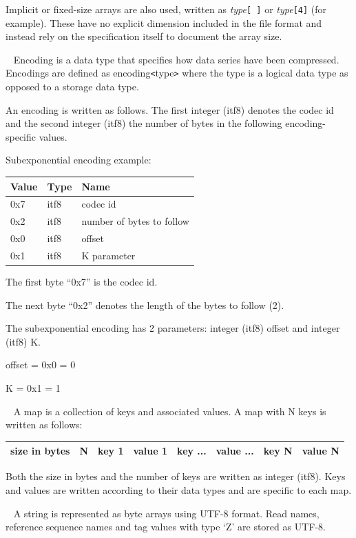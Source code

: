 \documentclass[a4paper]{article}
\begin{document}
\begin{description}
Implicit or fixed-size arrays are also used, written as \textit{type}\texttt{[ ]} or \textit{type}\texttt{[4]} (for example).
These have no explicit dimension included in the file format and instead rely on the specification itself to document the array size.


\item[{Encoding}]\ \newline
Encoding is a data type that specifies how data series have been compressed. Encodings 
are defined as encoding\texttt{<}type\texttt{>} where the type is a logical data 
type as opposed to a storage data type.

An encoding is written as follows. The first integer (itf8) denotes the codec id 
and the second integer (itf8) the number of bytes in the following encoding-specific 
values. 

Subexponential encoding example: 

\begin{tabular}{|l|l|l|}
\hline
\textbf{Value} & \textbf{Type} & \textbf{Name}\tabularnewline
\hline
0x7 & itf8 & codec id\tabularnewline
\hline
0x2 & itf8 & number of bytes to follow\tabularnewline
\hline
0x0 & itf8 & offset\tabularnewline
\hline
0x1 & itf8 & K parameter\tabularnewline
\hline
\end{tabular}

The first byte ``0x7'' is the codec id. 

The next byte ``0x2'' denotes the length of the bytes to follow (2). 

The subexponential encoding has 2 parameters: integer (itf8) offset and integer (itf8) K.

offset = 0x0 = 0

K = 0x1 = 1


\item[{Map}]\ \newline
A map is a collection of keys and associated values. A map with N keys is written 
as follows: 

\begin{tabular}{|l|l|l|l|l|l|l|l|}
\hline
size in bytes & N & key 1 & value 1 & key ... & value ... & key N & value N\tabularnewline
\hline
\end{tabular}

Both the size in bytes and the number of keys are written as integer (itf8). Keys 
and values are written according to their data types and are specific to each map.

\item[String]\ \newline
A string is represented as byte arrays using UTF-8 format. Read names, reference 
sequence names and tag values with type `Z' are stored as UTF-8.

\end{description}
\end{document}
